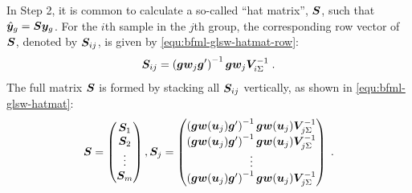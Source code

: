\documentclass[times]{interact}
\theoremstyle{plain}%
\theoremstyle{definition}
\theoremstyle{remark}
\begin{document}
In Step 2, it is common to calculate a so-called ``hat matrix'', $\bm{S}$, such that $\hat{\bm{y}}_g = \bm{S}\bm{y}_g$.
For the $i$th sample in the $j$th group, the corresponding row vector of $\bm{S}$, denoted by $\bm{S}_{ij}$, is given by \autoref{equ:bfml-glsw-hatmat-row}:
\begin{equation}\label{equ:bfml-glsw-hatmat-row}
  \bm{S}_{ij} = \left(\bm{g}\bm{w}_j\bm{g}'\right)^{-1} \bm{g}\bm{w}_j\bm{V}_{i\Sigma}^{-1} \;.
\end{equation}
The full matrix $\bm{S}$ is formed by stacking all $\bm{S}_{ij}$ vertically, as shown in \autoref{equ:bfml-glsw-hatmat}:
\begin{equation}\label{equ:bfml-glsw-hatmat}
  \bm{S} = \begin{pmatrix}
    \bm{S}_{1} \\ \bm{S}_{2} \\ \vdots \\ \bm{S}_{m}
  \end{pmatrix},
  \bm{S}_{j} = \begin{pmatrix}
    \left(\bm{g}\bm{w}(\bm{u}_j)\bm{g}'\right)^{-1} \bm{g}\bm{w}(\bm{u}_j)\bm{V}_{j\Sigma}^{-1} \\
    \left(\bm{g}\bm{w}(\bm{u}_j)\bm{g}'\right)^{-1} \bm{g}\bm{w}(\bm{u}_j)\bm{V}_{j\Sigma}^{-1} \\
    \vdots \\
    \left(\bm{g}\bm{w}(\bm{u}_j)\bm{g}'\right)^{-1} \bm{g}\bm{w}(\bm{u}_j)\bm{V}_{j\Sigma}^{-1}
  \end{pmatrix} \;.
\end{equation}
\end{document}
